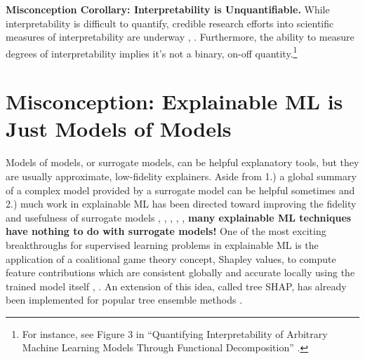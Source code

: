 \documentclass[fleqn]{article}
\begin{document}
\noindent \textbf{Misconception Corollary: Interpretability is Unquantifiable.} While interpretability is difficult to quantify, credible research efforts into scientific measures of interpretability are underway \cite{friedler2019assessing}, \cite{molnar2019quantifying}. Furthermore, the ability to measure degrees of interpretability implies it's not a binary, on-off quantity.\footnote{For instance, see Figure 3 in ``Quantifying Interpretability of Arbitrary Machine Learning Models Through Functional Decomposition'' \cite{molnar2019quantifying}.}

\section{Misconception: Explainable ML is Just Models of Models}

Models of models, or surrogate models, can be helpful explanatory tools, but they are usually approximate, low-fidelity explainers. Aside from 1.) a global summary of a complex model provided by a surrogate model can be helpful sometimes and 2.) much work in explainable ML has been directed toward improving the fidelity and usefulness of surrogate models \cite{dt_surrogate2}, \cite{viper}, \cite{dt_surrogate1}, \cite{lime-sup}, \cite{wf_xnn}, \textbf{many explainable ML techniques have nothing to do with surrogate models!} One of the most exciting breakthroughs for supervised learning problems in explainable ML is the application of a coalitional game theory concept, Shapley values, to compute feature contributions which are consistent globally and accurate locally using the trained model itself \cite{shapley}, \cite{kononenko2010efficient}. An extension of this idea, called tree SHAP, has already been implemented for popular tree ensemble methods \cite{tree_shap}. 
\end{document}
